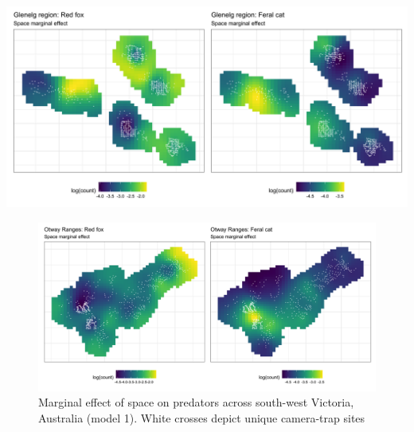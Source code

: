 \documentclass[]{elsarticle} %
\begin{document}
\newpage

\begin{center}\includegraphics[width=1\linewidth]{../figs/sp_marginal_g} \end{center}

\begin{figure}

{\centering \includegraphics[width=1\linewidth]{../figs/sp_marginal_o} 

}

\caption{Marginal effect of space on predators across south-west Victoria, Australia (model 1). White crosses depict unique camera-trap sites}\label{fig:diel-space-time-marginal-o}
\end{figure}

\newpage
\end{document}
